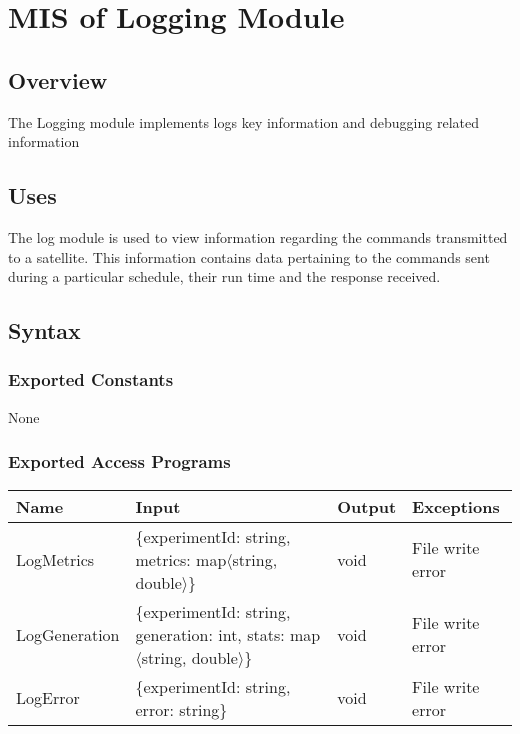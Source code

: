 \documentclass[12pt, titlepage]{article}
\begin{document}
\section{MIS of Logging Module} \label{Module}

\subsection{ Overview}

The Logging module implements logs key information and debugging related information
\subsection{ Uses}

The log module is used to view information regarding the commands transmitted to a satellite. This information contains data pertaining to the commands sent during a particular schedule, their run time and the response received. 

\subsection{ Syntax}

\subsubsection{ Exported Constants}
None

\subsubsection{Exported Access Programs}
\begin{center}
  \begin{tabular}{p{3cm} p{5cm} p{2.5cm} p{2.5cm}}
    \hline
    \textbf{Name} & \textbf{Input} & \textbf{Output} & \textbf{Exceptions} \\
    \hline
    LogMetrics & \{experimentId: string, metrics: map$\langle$string, double$\rangle$\} & void & File write error \\
    \hline
    LogGeneration & \{experimentId: string, generation: int, stats: map$\langle$string, double$\rangle$\} & void & File write error \\
    \hline
    LogError & \{experimentId: string, error: string\} & void & File write error \\
    \hline
  \end{tabular}
\end{center}
\end{document}

